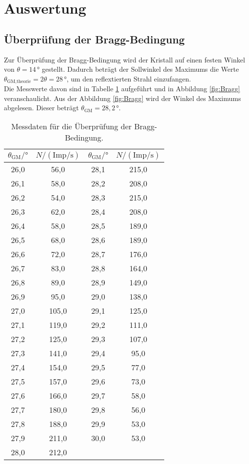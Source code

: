 \section{Auswertung}

\subsection{Überprüfung der Bragg-Bedingung}
Zur Überprüfung der Bragg-Bedingung wird der Kristall auf einen festen Winkel von  $\theta= 14\,\mathrm{°}$ gestellt. 
Dadurch beträgt der Sollwinkel des Maximums die Werte  $\theta_\text{GM,theorie}=2\theta=28\,\mathrm{°}$, um den reflextierten Strahl einzufangen.\\
Die Messwerte davon sind in Tabelle \ref{tab:Braggbedingung} aufgeführt und in Abbildung \ref{fig:Bragg} veranschaulicht.
Aus der Abbildung \ref{fig:Bragg} wird der Winkel des Maximums abgelesen. Dieser beträgt $\theta_\text{GM}=28,2\,\mathrm{°}$.
\begin{table}[H]
    \centering
    \caption{Messdaten für die Überprüfung der Bragg-Bedingung.}
    \label{tab:Braggbedingung}
    \begin{tabular}{|c| c || c |c|}
    \toprule
    $\theta_\text{GM}/\mathrm{°}$ & $N/(\mathrm{Imp/s})$ & $\theta_\text{GM}/\mathrm{°}$ & $N/(\mathrm{Imp/s})$\\
    \midrule
    26,0 & 	56,0 &28,1&215,0\\
    26,1 & 	58,0 &28,2&208,0\\
    26,2 & 	54,0 &28,3&215,0\\
    26,3 &	62,0 &28,4&208,0\\
    26,4 &	58,0 &28,5&189,0\\
    26,5 &	68,0 &28,6&189,0\\
    26,6 &	72,0 &28,7&176,0\\
    26,7 &	83,0 &28,8&164,0\\
    26,8 &	89,0 &28,9&149,0\\
    26,9 &	95,0 &29,0&138,0\\
    27,0 &	105,0&29,1 &125,0\\
    27,1 &	119,0&29,2 &111,0\\ 
    27,2 &	125,0&29,3 &107,0\\
    27,3 &	141,0&29,4 &95,0\\
    27,4 &	154,0& 29,5&77,0\\
    27,5 &	157,0&29,6&73,0\\
    27,6 &	166,0&29,7 &58,0\\
    27,7 &	180,0&29,8 &56,0\\
    27,8 &	188,0&29,9 &53,0\\
    27,9 &	211,0&30,0 &53,0\\
    28,0 &	212,0& &\\              
    \bottomrule
    \end{tabular}
\end{table}

